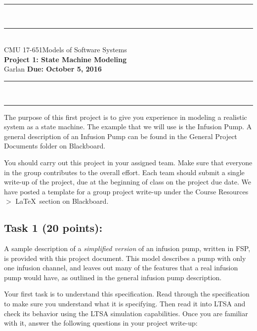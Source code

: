 \documentclass{article}
\newcommand{\head}{\subsection*}
\begin{document}
\begin{center}
\rule{\textwidth}{1.5pt} \\ \rule[10pt]{\textwidth}{1pt}\\
CMU 17-651\hfill Models of Software Systems\\[3ex]
{\Large\bf Project 1: State Machine Modeling}\\[3ex]
Garlan \hfill {\bf Due: October 5, 2016} \rule{\textwidth}{1pt}
\\\rule[9.5pt]{\textwidth}{1.5pt}
\end{center}

The purpose of this first project is to give you experience in
modeling a realistic system as a state machine. The example that we
will use is the Infusion Pump. A general description of an Infusion
Pump can be found in the General Project Documents folder on
Blackboard.

\bigskip You should carry out this project in your assigned team. Make sure that everyone in the group contributes to the overall effort. Each team should submit a single write-up of the project,
due at the beginning of class on the project due date. We have
posted a template for a group project write-up under the Course
Resources $>$ \LaTeX~section on Blackboard.

\head{Task 1 (20 points):}

A sample description of a \emph{simplified version} of an infusion
pump, written in FSP, is provided with this project document. This
model describes a pump with only one infusion channel, and leaves
out many of the features that a real infusion pump would have, as
outlined in the general infusion pump description.

\bigskip Your first task is to understand this specification. Read
through the specification to make sure you understand what it is
specifying. Then read it into LTSA and check its behavior using the
LTSA simulation capabilities. Once you are familiar with it, answer
the following questions in your project write-up:
\end{document}
